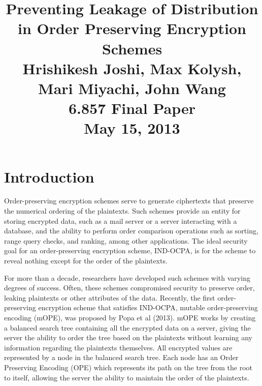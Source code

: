 \documentclass[12pt]{article}
\title{
  Preventing Leakage of Distribution in Order Preserving Encryption Schemes \\ \vspace*{.3in}
\small Hrishikesh Joshi, Max Kolysh, Mari Miyachi, John Wang \\
\small 6.857 Final Paper \\
\small May 15, 2013}
\date{}
\begin{document}
\maketitle


\newpage

\tableofcontents

\newpage

\section{Introduction}

Order-preserving encryption schemes serve to generate ciphertexts that preserve the numerical ordering of the plaintexts. Such schemes provide an entity for storing encrypted data, such as a mail server or a server interacting with a database, and the ability to perform order comparison operations such as sorting, range query checks, and ranking, among other applications. The ideal security goal for an order-preserving encryption scheme, IND-OCPA, is for the scheme to reveal nothing except for the order of the plaintexts.

For more than a decade, researchers have developed such schemes with varying degrees of success. Often, these schemes compromised security to preserve order, leaking plaintexts or other attributes of the data. Recently, the first order-preserving encryption scheme that satisfies IND-OCPA, mutable order-preserving encoding (mOPE), was proposed by Popa et al (2013). mOPE works by creating a balanced search tree containing all the encrypted data on a server, giving the server the ability to order the tree based on the plaintexts without learning any information regarding the plaintexts themselves. All encrypted values are represented by a node in the balanced search tree. Each node has an Order Preserving Encoding (OPE) which represents its path on the tree from the root to itself, allowing the server the ability to maintain the order of the plaintexts.
\end{document}
